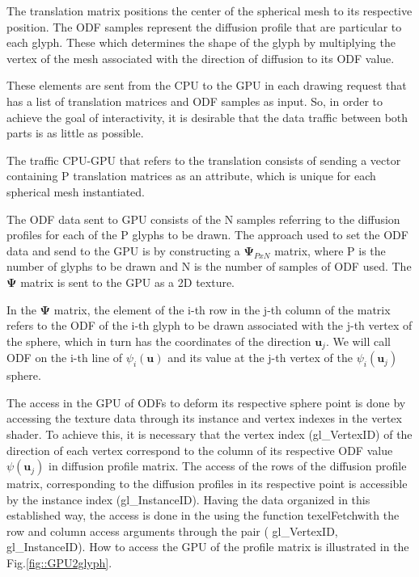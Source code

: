 \documentclass[twoside,twocolumn,10pt]{article}
\begin{document}
The translation matrix positions the center of the spherical mesh to its respective position. The ODF samples represent the diffusion profile that are particular to each glyph. These which determines the shape of the glyph by multiplying the vertex of the mesh associated with the direction of diffusion to its ODF value.


These elements are sent from the CPU to the GPU in each drawing request that has a list of translation matrices and ODF samples as input. So, in order to achieve the goal of interactivity, it is desirable that the data traffic between both parts is as little as possible.

The traffic CPU-GPU that refers to the translation consists of sending a vector containing P translation matrices as an attribute, which is unique for each spherical mesh instantiated.

The ODF data sent to GPU consists of the N samples referring to the diffusion profiles for each of the P glyphs to be drawn. The approach used to set the ODF data and send to the GPU is by constructing a $\bm{\Psi}_{PxN}$ matrix, where P is the number of glyphs to be drawn and N is the number of samples of ODF used. The $\bm{\Psi}$ matrix is sent to the GPU as a 2D texture.


In the $\bm{\Psi}$ matrix, the element of the i-th row in the j-th column of the matrix refers to the ODF of the i-th glyph to be drawn associated with the j-th vertex of the sphere, which in turn has the coordinates of the direction $ \bm{u}_j $. We will call ODF on the i-th line of $ \psi_i(\bm{u})$ and its value at the j-th vertex of the $\psi_i(\bm{u}_j)$ sphere.

The access in the GPU of ODFs to deform its respective sphere point is done by accessing the texture data through its instance and vertex indexes in the vertex shader. To achieve this, it is necessary that the vertex index (gl\_VertexID\footnotemark) of the direction of each vertex correspond to the column of its respective ODF value $ \psi (\bm{u}_j) $ in diffusion profile matrix. The access of the rows of the diffusion profile matrix, corresponding to the diffusion profiles in its respective point is accessible by the instance index (gl\_InstanceID\footnotemark [\value{footnote}]). Having the data organized in this established way, the access is done in the using the function texelFetch\footnotemark[\value{footnote}] with the row and column access arguments through the pair ( gl\_VertexID, gl\_InstanceID)\footnotemark [\value{footnote}] . How to access the GPU of the profile matrix is illustrated in the Fig.\ref{fig::GPU2glyph}.
\end{document}
